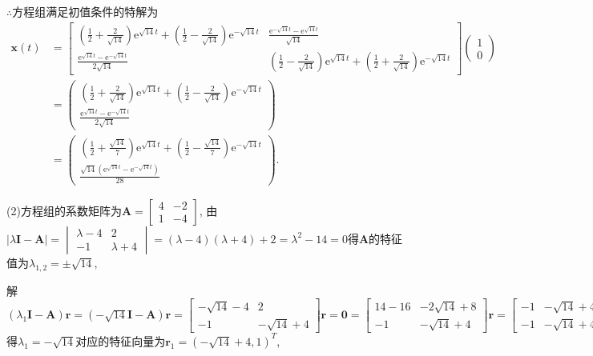 \documentclass[12pt,UTF8]{ctexart}
\newcommand{\me}[0]{\mathrm e}
\begin{document}
\begin{enumerate}
$\therefore$方程组满足初值条件的特解为
\[\begin{aligned}
\bm x(t)&=\begin{bmatrix}
(\frac12+\frac2{\sqrt{14}})\me^{\sqrt{14}t}+(\frac12-\frac2{\sqrt{14}})\me^{-\sqrt{14}t}&\frac{\me^{-\sqrt{14}t}-\me^{\sqrt{14}t}}{\sqrt{14}}\\
\frac{\me^{\sqrt{14}t}-\me^{-\sqrt{14}t}}{2\sqrt{14}}&(\frac12-\frac2{\sqrt{14}})\me^{\sqrt{14}t}+(\frac12+\frac2{\sqrt{14}})\me^{-\sqrt{14}t}
\end{bmatrix}\begin{pmatrix}1\\0\end{pmatrix}\\
&=\begin{pmatrix}(\frac12+\frac2{\sqrt{14}})\me^{\sqrt{14}t}+(\frac12-\frac2{\sqrt{14}})\me^{-\sqrt{14}t}\\\frac{\me^{\sqrt{14}t}-\me^{-\sqrt{14}t}}{2\sqrt{14}}\end{pmatrix}\\
&=\begin{pmatrix}(\frac12+\frac{\sqrt{14}}7)\me^{\sqrt{14}t}+(\frac12-\frac{\sqrt{14}}7)\me^{-\sqrt{14}t}\\\frac{\sqrt{14}(\me^{\sqrt{14}t}-\me^{-\sqrt{14}t})}{28}\end{pmatrix}.
\end{aligned}\]

(2)方程组的系数矩阵为$\bm A=\begin{bmatrix}4&-2\\1&-4\end{bmatrix}$, 由$|\lambda\bm I-\bm A|=\begin{vmatrix}\lambda-4&2\\-1&\lambda+4\end{vmatrix}=(\lambda-4)(\lambda+4)+2=\lambda^2-14=0$得$\bm A$的特征值为$\lambda_{1,2}=\pm\sqrt{14}$, 

解$(\lambda_1\bm I-\bm A)\bm r=(-\sqrt{14}\bm I-\bm A)\bm r=\begin{bmatrix}-\sqrt{14}-4&2\\-1&-\sqrt{14}+4\end{bmatrix}\bm r=\bm0=\begin{bmatrix}14-16&-2\sqrt{14}+8\\-1&-\sqrt{14}+4\end{bmatrix}\bm r=\begin{bmatrix}-1&-\sqrt{14}+4\\-1&-\sqrt{14}+4\end{bmatrix}\bm r=\begin{bmatrix}-1&-\sqrt{14}+4\\0&0\end{bmatrix}\bm r$得$\lambda_1=-\sqrt{14}$对应的特征向量为$\bm r_1=(-\sqrt{14}+4,1)^T$,


\end{enumerate}
\end{document}

